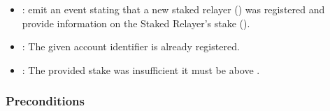\documentclass[a4paper,10pt,english]{sphinxmanual}
\begin{document}
\begin{itemize}
\item {} 
: emit an event stating that a new staked relayer () was registered and provide information on the Staked Relayer’s stake ().

\end{itemize}

\begin{itemize}
\item {} 
: The given account identifier is already registered.

\item {} 
: The provided stake was insufficient \sphinxhyphen{} it must be above .

\end{itemize}


\subsubsection{Preconditions}
\label{\detokenize{spec/staked-relayers:preconditions}}
\end{document}
